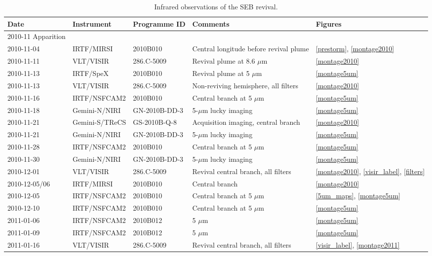 \documentclass[final,authoryear,5p,times,twocolumn]{elsarticle}
\begin{document}
\begin{table*}[htdp]
\caption{Infrared observations of the SEB revival.}
\begin{center}
\begin{tabular}{|l|l|l|l|l|}
\hline
Date & Instrument & Programme ID & Comments & Figures \\
\hline
2010-11 Apparition & & & & \\
\hline
2010-11-04 & IRTF/MIRSI & 2010B010 & Central longitude before revival plume & \ref{prestorm}, \ref{montage2010} \\
2010-11-11 & VLT/VISIR & 286.C-5009 & Revival plume at 8.6 $\mu$m & \ref{montage2010} \\
2010-11-13 & IRTF/SpeX &  2010B010 & Revival plume at 5 $\mu$m & \ref{montage5um} \\
2010-11-13 & VLT/VISIR & 286.C-5009 & Non-reviving hemisphere, all filters & \ref{montage2010} \\
2010-11-16 & IRTF/NSFCAM2 & 2010B010 & Central branch at 5 $\mu$m &  \ref{montage5um} \\
2010-11-18 & Gemini-N/NIRI & GN-2010B-DD-3 & 5-$\mu$m lucky imaging &  \ref{montage5um} \\
2010-11-21 & Gemini-S/TReCS & GS-2010B-Q-8 & Acquisition imaging, central branch & \ref{montage2010} \\
2010-11-21 & Gemini-N/NIRI & GN-2010B-DD-3 & 5-$\mu$m lucky imaging &  \ref{montage5um} \\
2010-11-28 & IRTF/NSFCAM2 & 2010B010& Central branch at 5 $\mu$m &  \ref{montage5um}  \\
2010-11-30 & Gemini-N/NIRI & GN-2010B-DD-3 & 5-$\mu$m lucky imaging &  \ref{montage5um}  \\
2010-12-01 & VLT/VISIR & 286.C-5009 & Revival central branch, all filters & \ref{montage2010}, \ref{visir_label}, \ref{filters} \\
2010-12-05/06 & IRTF/MIRSI & 2010B010 & Central branch & \ref{montage2010} \\
2010-12-05 & IRTF/NSFCAM2 & 2010B010& Central branch at 5 $\mu$m &  \ref{5um_maps}, \ref{montage5um} \\
2010-12-10 & IRTF/NSFCAM2 & 2010B010& Central branch at 5 $\mu$m &  \ref{montage5um} \\
2011-01-06 & IRTF/NSFCAM2 & 2010B012& 5 $\mu$m &  \ref{montage5um} \\
2011-01-09 & IRTF/NSFCAM2 &2010B012 & 5 $\mu$m &  \ref{montage5um} \\
2011-01-16 & VLT/VISIR & 286.C-5009 & Revival central branch, all filters & \ref{visir_label},  \ref{montage2011} \\

\end{tabular}
\end{center}
\end{table*}
\end{document}
